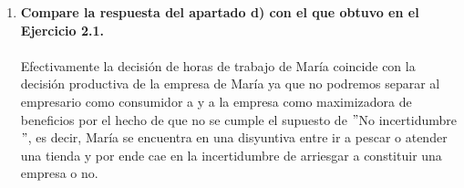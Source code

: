\begin{enumerate}
\begin{enumerate}[\bfseries 2.1]
\begin{enumerate}[\bfseries a)]
		    \item  \textbf{Compare la respuesta del apartado d) con el que obtuvo en el Ejercicio 2.1.}\\\\
			Efectivamente la decisión de horas de trabajo de María coincide con la decisión productiva de la empresa de María ya que no podremos separar al empresario como consumidor a y a la empresa como maximizadora de beneficios por el hecho de que no se cumple el supuesto de $"$No incertidumbre $"$, es decir, María se encuentra en una disyuntiva entre ir a pescar o atender una tienda y por ende cae en la incertidumbre de arriesgar a constituir una empresa o no.\\\\


		\end{enumerate}


	\end{enumerate}

\end{enumerate}
